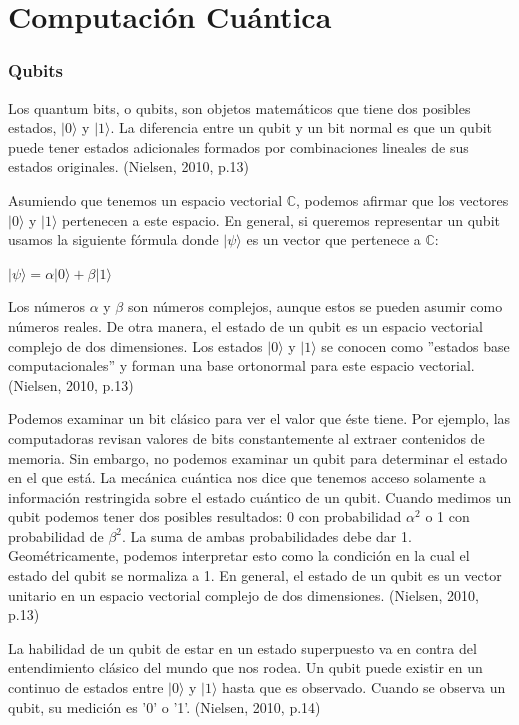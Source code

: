 \documentclass[11pt,a4paper]{article}
\begin{document}
\part{Computación Cuántica}
\section*{Qubits}

Los quantum bits, o qubits, son objetos matemáticos que tiene dos posibles estados,  $\vert 0\rangle$ y $\vert 1\rangle$. La diferencia entre un qubit y un bit normal es que un qubit puede tener estados adicionales formados por combinaciones lineales de sus estados originales. (Nielsen, 2010, p.13)

Asumiendo que tenemos un espacio vectorial $\mathbb{C}$, podemos afirmar que los vectores $\vert 0\rangle$ y $\vert 1\rangle$ pertenecen a este espacio. En general, si queremos representar un qubit usamos la siguiente fórmula donde $\vert \psi \rangle$ es un vector que pertenece a $\mathbb{C}$:

\begin{center}
$\vert \psi \rangle = \alpha \vert 0\rangle + \beta \vert 1\rangle$
\end{center}

Los números $\alpha$ y $\beta$ son números complejos, aunque estos se pueden asumir como números reales. De otra manera, el estado de un qubit es un espacio vectorial complejo de dos dimensiones. Los estados $\vert 0\rangle$ y $\vert 1\rangle$ se conocen como ''estados base computacionales'' y forman una base ortonormal para este espacio vectorial. (Nielsen, 2010, p.13)

Podemos examinar un bit clásico para ver el valor que éste tiene. Por ejemplo, las computadoras revisan valores de bits constantemente al extraer contenidos de memoria. Sin embargo, no podemos examinar un qubit para determinar el estado en el que está. La mecánica cuántica nos dice que tenemos acceso solamente a información restringida sobre el estado cuántico de un qubit. Cuando medimos un qubit podemos tener dos posibles resultados: 0 con probabilidad $\alpha^2$ o 1 con probabilidad de $\beta^2$. La suma de ambas probabilidades debe dar 1. Geométricamente, podemos interpretar esto como la condición en la cual el estado del qubit se normaliza a 1. En general, el estado de un qubit es un vector unitario en un espacio vectorial complejo de dos dimensiones.  (Nielsen, 2010, p.13)

La habilidad de un qubit de estar en un estado superpuesto va en contra del entendimiento clásico del mundo que nos rodea. Un qubit puede existir en un continuo de estados entre $\vert 0\rangle$ y $\vert 1\rangle$ hasta que es observado. Cuando se observa un qubit, su medición es '0' o '1'. (Nielsen, 2010, p.14)
\end{document}
